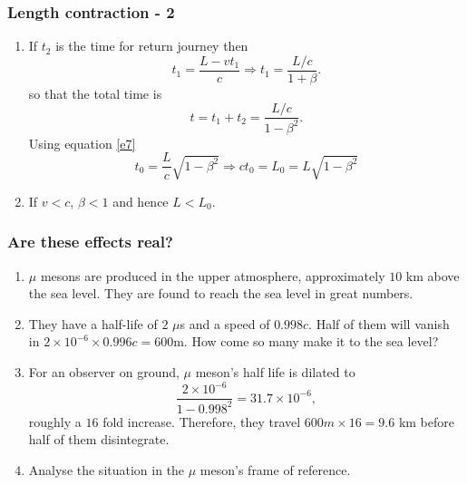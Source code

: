 \documentclass{beamer}
\begin{document}
\begin{frame}
\frametitle{Length contraction - 2}
\begin{enumerate}
\item If $t_2$ is the time for return journey then
\begin{equation}\label{e10}
t_1 = \frac{L - vt_1}{c} \Rightarrow t_1 = \frac{L/c}{1 + \beta}.
\end{equation}
so that the total time is
\begin{equation}\label{e11}
t = t_1 + t_2 = \frac{L/c}{1 - \beta^2}.
\end{equation}
Using equation \eqref{e7}
\begin{equation}\label{e12}
t_0 = \frac{L}{c}\sqrt{1 - \beta^2} \Rightarrow ct_0 = L_0 = L\sqrt{1 - \beta^2}
\end{equation}
\item If $v < c$, $\beta < 1$ and hence $L < L_0$.
\end{enumerate}
\end{frame}

\begin{frame}
\frametitle{Are these effects real?}
\begin{enumerate}
\item $\mu$ mesons are produced in the upper atmosphere, approximately $10$ km
above the sea level. They are found to reach the sea level in great numbers.
\item They have a half-life of $2$ $\mu$s and a speed of $0.998c$. Half of them
will vanish in $2 \times 10^{-6} \times 0.996c = 600$m. How come so many make it
to the sea level? 
\item For an observer on ground, $\mu$ meson's half life is dilated to 
\[
\frac{2 \times 10^{-6}}{1 - 0.998^2} = 31.7 \times 10^{-6},
\]
roughly a $16$ fold increase. Therefore, they travel $600m \times 16 = 9.6$ km
before half of them disintegrate.
\item Analyse the situation in the $\mu$ meson's frame of reference.
\end{enumerate}
\end{frame}
\end{document}
